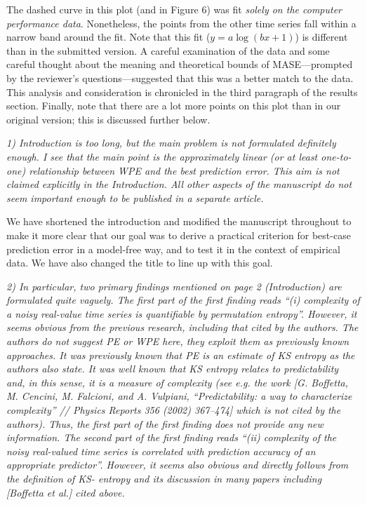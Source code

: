 \documentclass[12pt]{article}
\begin{document}
\noindent The dashed curve in this plot (and in Figure 6) was fit
\emph{solely on the computer performance data}.  Nonetheless, the
points from the other time series fall within a narrow band around the
fit.  Note that this fit ($y = a \log(b x + 1)$) is different than in
the submitted version.  A careful examination of the data and some
careful thought about the meaning and theoretical bounds of
MASE---prompted by the reviewer's questions---suggested that this was
a better match to the data.  This analysis and consideration is
chronicled in the third paragraph of the results section.  Finally,
note that there are a lot more points on this plot than in our
original version; this is discussed further below.

\smallskip

\emph{1) Introduction is too long, but the main problem is not
  formulated definitely enough. I see that the main point is the
  approximately linear (or at least one-to-one) relationship between
  WPE and the best prediction error. This aim is not claimed
  explicitly in the Introduction. All other aspects of the manuscript
  do not seem important enough to be published in a separate article.}

We have shortened the introduction and modified the manuscript
throughout to make it more clear that our goal was to derive a
practical criterion for best-case prediction error in a model-free
way, and to test it in the context of empirical data.  We have also
changed the title to line up with this goal.

\smallskip

\emph{2) In particular, two primary findings mentioned on page 2
  (Introduction) are formulated quite vaguely. The first part of the
  first finding reads ``(i) complexity of a noisy real-value time
  series is quantifiable by permutation entropy''. However, it seems
  obvious from the previous research, including that cited by the
  authors. The authors do not suggest PE or WPE here, they exploit
  them as previously known approaches. It was previously known that PE
  is an estimate of KS entropy as the authors also state. It was well
  known that KS entropy relates to predictability and, in this sense,
  it is a measure of complexity (see e.g. the work [G. Boffetta,
    M. Cencini, M. Falcioni, and A.  Vulpiani, ``Predictability: a way
    to characterize complexity'' // Physics Reports 356 (2002)
    367–474] which is not cited by the authors). Thus, the first part
  of the first finding does not provide any new information. The
  second part of the first finding reads ``(ii) complexity of the
  noisy real-valued time series is correlated with prediction accuracy
  of an appropriate predictor''.  However, it seems also obvious and
  directly follows from the definition of KS- entropy and its
  discussion in many papers including [Boffetta et al.] cited above.}
\end{document}
